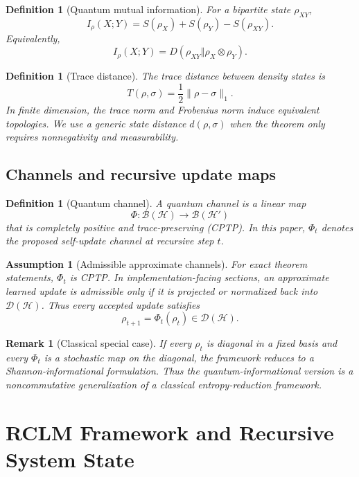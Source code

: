 \documentclass[11pt]{article}
\newtheorem{definition}[theorem]{Definition}
\newtheorem{assumption}[theorem]{Assumption}
\newtheorem{remark}[theorem]{Remark}
\newcommand{\D}{\mathcal{D}}
\newcommand{\Hcal}{\mathcal{H}}
\newcommand{\1}{\mathbf{1}}
\begin{document}
\begin{definition}[Quantum mutual information]
For a bipartite state \(\rho_{XY}\),
\[
I_\rho(X;Y)=S(\rho_X)+S(\rho_Y)-S(\rho_{XY}).
\]
Equivalently,
\[
I_\rho(X;Y)=D(\rho_{XY}\Vert \rho_X\otimes\rho_Y).
\]
\end{definition}

\begin{definition}[Trace distance]
The trace distance between density states is
\[
T(\rho,\sigma)=\frac12\|\rho-\sigma\|_1.
\]
In finite dimension, the trace norm and Frobenius norm induce equivalent topologies. We use a generic state distance \(d(\rho,\sigma)\) when the theorem only requires nonnegativity and measurability.
\end{definition}

\subsection{Channels and recursive update maps}

\begin{definition}[Quantum channel]
A quantum channel is a linear map
\[
\Phi:\mathcal B(\Hcal)\to\mathcal B(\Hcal')
\]
that is completely positive and trace-preserving (CPTP). In this paper, \(\Phi_t\) denotes the proposed self-update channel at recursive step \(t\).
\end{definition}

\begin{assumption}[Admissible approximate channels]
For exact theorem statements, \(\Phi_t\) is CPTP. In implementation-facing sections, an approximate learned update is admissible only if it is projected or normalized back into \(\D(\Hcal)\). Thus every accepted update satisfies
\[
\rho_{t+1}=\Phi_t(\rho_t)\in\D(\Hcal).
\]
\end{assumption}

\begin{remark}[Classical special case]
If every \(\rho_t\) is diagonal in a fixed basis and every \(\Phi_t\) is a stochastic map on the diagonal, the framework reduces to a Shannon-informational formulation. Thus the quantum-informational version is a noncommutative generalization of a classical entropy-reduction framework.
\end{remark}

\section{RCLM Framework and Recursive System State}
\end{document}
